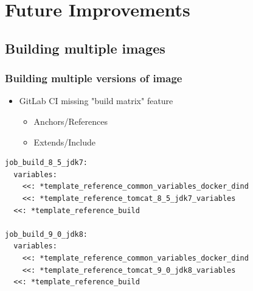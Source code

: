 \documentclass[14pt,aspectratio=169]{beamer}
\begin{document}
\section{Future Improvements}

\subsection{Building multiple images}

\begin{frame}[fragile]
  \frametitle{Building multiple versions of image}
  \begin{itemize}
    \item GitLab CI missing "build matrix" feature
    \begin{itemize}
      \item Anchors/References
      \item Extends/Include
    \end{itemize}
  \end{itemize}
  \begin{verbatim}
job_build_8_5_jdk7:
  variables:
    <<: *template_reference_common_variables_docker_dind
    <<: *template_reference_tomcat_8_5_jdk7_variables
  <<: *template_reference_build

job_build_9_0_jdk8:
  variables:
    <<: *template_reference_common_variables_docker_dind
    <<: *template_reference_tomcat_9_0_jdk8_variables
  <<: *template_reference_build
  \end{verbatim}
\end{frame}
\end{document}

